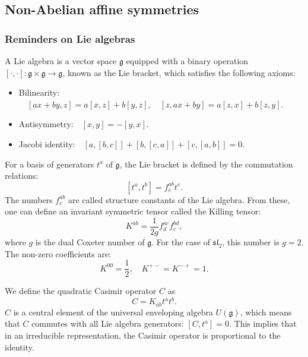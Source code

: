 \documentclass[10pt,a4paper]{article}
\numberwithin{equation}{section}
\begin{document}
\subsection{Non-Abelian affine symmetries}
\subsubsection*{Reminders on Lie algebras}
A Lie algebra is a vector space $\mathfrak{g}$ equipped with a binary operation $\left[\cdot,\cdot \right]:\mathfrak{g}\times \mathfrak{g} \rightarrow \mathfrak{g}$,
known as the Lie bracket, which satisfies the following axioms:
\begin{itemize}
    \item Bilinearity:$\quad \left[ax+by,z \right] = a \left[x,z\right] + b \left[y,z\right],\quad \left[z,ax+by \right] = a \left[z,x\right] + b \left[z,y\right]$.
    \item Antisymmetry:$\quad \left[x,y\right] = - \left[y,x\right]$.
    \item Jacobi identity:$\quad \left[a,\left[b,c\right]\right]+\left[b,\left[c,a\right]\right]+\left[c,\left[a,b\right]\right] = 0$.
\end{itemize}
For a basis of generators $t^{a}$ of $\mathfrak{g}$, the Lie bracket is defined by the commutation relations:
\begin{equation}
    \left[t^{a},t^{b}\right] = f^{ab}_{c} t^{c}.
\end{equation}
The numbers $f^{ab}_{c}$ are called structure constants of the Lie algebra. From these, one can define an invariant symmetric tensor 
called the Killing tensor: 
\begin{equation}
    K^{ab} = \frac{1}{2g} f^{ac}_{d}f^{bd}_{c},
\end{equation}
where $g$ is the dual Coxeter number of $\mathfrak{g}$. For the case of $\mathfrak{sl}_{2}$, this number is $g = 2$. The non-zero 
coefficients are:
\begin{equation}
    K^{00} = \frac{1}{2}, \quad K^{+-} = K^{-+} = 1.
\end{equation}

We define the quadratic Casimir operator $C$ as 
\begin{equation}
    C = K_{ab} t^{a} t^{b}.
\end{equation}
$C$ is a central element of the universal enveloping algebra $U(\mathfrak{g})$, which means that 
$C$ commutes with all Lie algebra generators: $\left[C,t^{a}\right] = 0$. This implies that in an irreducible representation, 
the Casimir operator is proportional to the identity. 
\end{document}
